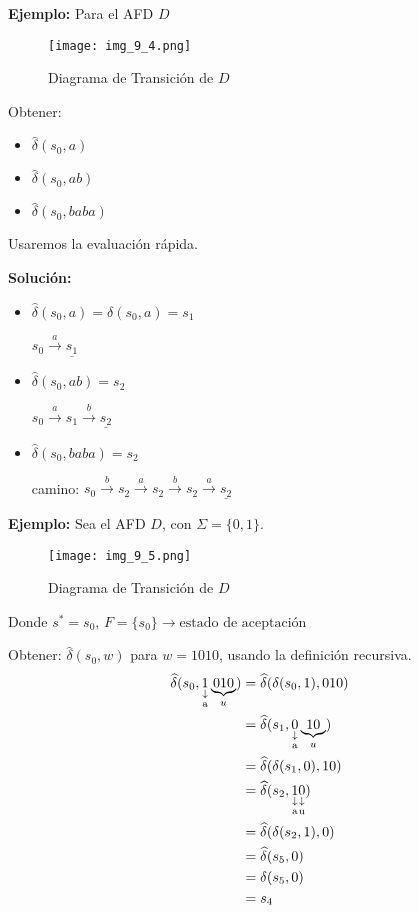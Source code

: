 \textbf{Ejemplo: }Para el AFD $D$

\begin{figure}[h!]
\centering
\texttt{[image: img\_9\_4.png]}
\caption{Diagrama de Transición de $D$}\label{img_9_4}
\end{figure}
Obtener:
\begin{itemize}
\item $\widehat{\delta}(s_0,a)$
\item $\widehat{\delta}(s_0,ab)$
\item $\widehat{\delta}(s_0,baba)$
\end{itemize}
Usaremos la evaluación rápida.

\textbf{Solución: }
\begin{itemize}
\item $\widehat{\delta}(s_0,a)=\delta(s_0,a)=s_1$

	$s_0\xrightarrow{a} \underline{s_1}$
\item $\widehat{\delta}(s_0,ab)=s_2$

	$s_0\xrightarrow{a}s_1\xrightarrow{b}\underline{s_2}$
\item $\widehat{\delta}(s_0,baba)=s_2$

camino: $s_0\xrightarrow{b}s_2\xrightarrow{a}s_2\xrightarrow{b}s_2\xrightarrow{a}\underline{s_2}$
\end{itemize}
\textbf{Ejemplo: }Sea el AFD $D$, con $\Sigma=\{0,1\}$.

\begin{figure}[h!]
\centering
\texttt{[image: img\_9\_5.png]}
\caption{Diagrama de Transición de $D$}\label{img_9_5}
\end{figure}

Donde $s^*=s_0$, $F=\{s_0\}\rightarrow\mbox{estado de aceptación}$

Obtener: $\widehat{\delta}(s_0,w)$ para $w=1010$, usando la definición recursiva.
\begin{align*}
\widehat{\delta}(s_0,\downlegend{1}{a}\underbrace{010}_{u})&=\widehat{\delta}(\delta(s_0,1),010)	\\
				&=\widehat{\delta}(s_1,\downlegend{0}{a}\underbrace{10}_{u})	\\
				&=\widehat{\delta}(\delta(s_1,0),10)	\\
				&=\widehat{\delta}(s_2,\downlegend{1}{a}\downlegend{0}{u})	\\
				&=\widehat{\delta}(\delta(s_2,1),0)	\\
				&=\widehat{\delta}(s_5,0)	\\
				&=\delta(s_5,0)	\\
				&= s_4
\end{align*}


